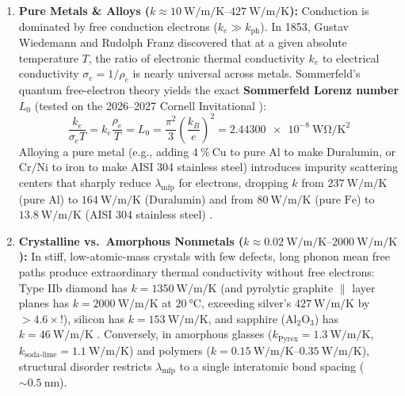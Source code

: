 \begin{enumerate}
  \item \textbf{Pure Metals \& Alloys ($k \approx \SIrange{10}{427}{\watt\per\meter\per\kelvin}$):} Conduction is dominated by free conduction electrons ($k_e \gg k_{\mathrm{ph}}$). In 1853, Gustav Wiedemann and Rudolph Franz discovered that at a given absolute temperature $T$, the ratio of electronic thermal conductivity $k_e$ to electrical conductivity $\sigma_e = 1/\rho_e$ is nearly universal across metals. Sommerfeld's quantum free-electron theory yields the exact \textbf{Sommerfeld Lorenz number} $L_0$ (tested on the 2026--2027 Cornell Invitational ):
  \begin{equation}
    \frac{k_e}{\sigma_e T} = k_e \frac{\rho_e}{T} = L_0 = \frac{\pi^2}{3}\!\left(\frac{k_B}{e}\right)^{\!2} = \SI{2.44300e-8}{\watt\ohm\per\square\kelvin}
    \label{eq:10:wiedemann-franz}
  \end{equation}
  Alloying a pure metal (e.g., adding $\SI{4}{\percent}\ \mathrm{Cu}$ to pure $\mathrm{Al}$ to make Duralumin, or $\mathrm{Cr/Ni}$ to iron to make AISI 304 stainless steel) introduces impurity scattering centers that sharply reduce $\lambda_{\mathrm{mfp}}$ for electrons, dropping $k$ from $\SI{237}{\watt\per\meter\per\kelvin}$ (pure $\mathrm{Al}$) to $\SI{164}{\watt\per\meter\per\kelvin}$ (Duralumin) and from $\SI{80}{\watt\per\meter\per\kelvin}$ (pure $\mathrm{Fe}$) to $\SI{13.8}{\watt\per\meter\per\kelvin}$ (AISI 304 stainless steel) .
  \item \textbf{Crystalline vs.\ Amorphous Nonmetals ($k \approx \SIrange{0.02}{2000}{\watt\per\meter\per\kelvin}$):} In stiff, low-atomic-mass crystals with few defects, long phonon mean free paths produce extraordinary thermal conductivity without free electrons: Type IIb diamond has $k = \SI{1350}{\watt\per\meter\per\kelvin}$ (and pyrolytic graphite $\parallel$ layer planes has $k = \SI{2000}{\watt\per\meter\per\kelvin}$ at $\SI{20}{\celsius}$, exceeding silver's $\SI{427}{\watt\per\meter\per\kelvin}$ by $>4.6\times$!), silicon has $k = \SI{153}{\watt\per\meter\per\kelvin}$, and sapphire ($\mathrm{Al_2O_3}$) has $k = \SI{46}{\watt\per\meter\per\kelvin}$ . Conversely, in amorphous glasses ($k_{\mathrm{Pyrex}} = \SI{1.3}{\watt\per\meter\per\kelvin}$, $k_{\mathrm{soda\text{-}lime}} = \SI{1.1}{\watt\per\meter\per\kelvin}$) and polymers ($k = \SIrange{0.15}{0.35}{\watt\per\meter\per\kelvin}$), structural disorder restricts $\lambda_{\mathrm{mfp}}$ to a single interatomic bond spacing ($\sim \SI{0.5}{\nano\meter}$).

\end{enumerate}
